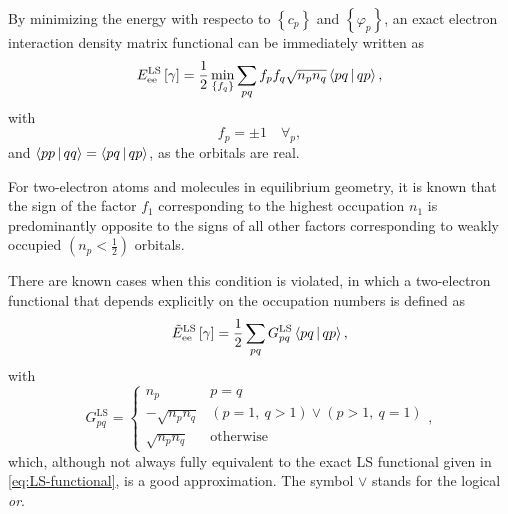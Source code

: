 \begin{enumerate}
        By minimizing the energy with respecto to $\left\{ c_p \right\}$ and
        $\left\{ \varphi_p \right\}$, an exact electron interaction density
        matrix functional can be immediately written as 
        \begin{equation} \label{eq:LS-functional}
            E_{\text{ee}}^{\text{LS}} \left[ \fordm \right] =
            \frac{1}{2} \min_{ \left\{ f_q \right\}} \sum_{pq}
            f_p f_q \sqrt{n_p n_q} \Braket{pq | qp}
            ,
        \end{equation}
        with 
        \begin{equation}
            f_p = \pm 1\quad \forall_p
            ,
        \end{equation}
        and $ \Braket{pp | qq} = \Braket{pq | qp}$, as the orbitals are real.

        For two-electron atoms and molecules in equilibrium geometry, it is 
        known that the sign of the factor $f_1$ corresponding to the highest 
        occupation $n_1$ is predominantly opposite to the signs of all other 
        factors corresponding to weakly occupied $\left( n_p < \frac{1}{2} \right)$
        orbitals.

        There are known cases when this condition is violated, in which a two-electron functional that depends 
        explicitly on the occupation numbers is defined as
        \begin{equation} \label{eq:Eee-LS-functional}
            \tilde{E}_{\text{ee}}^{\text{LS}} \left[ \fordm \right] =
            \frac{1}{2} \sum_{pq}  G_{pq}^{\text{LS}} \Braket{pq | qp},
        \end{equation}
        with 
        \begin{equation} \label{eq:GLS}
            G_{pq}^{\text{LS}} =
            \begin{cases}
                n_p & p = q \\
                - \sqrt{n_p n_q} & \left( p = 1,\ q > 1 \right) \vee \left( p>1,\ q=1 \right) \\
                \sqrt{n_p n_q} & \text{otherwise}
            \end{cases}
            ,
        \end{equation}
        which, although not always fully equivalent to the exact LS functional
        given in \cref{eq:LS-functional}, is a good approximation.
        The symbol $\vee$ stands for the logical \textit{or}.


\end{enumerate}
